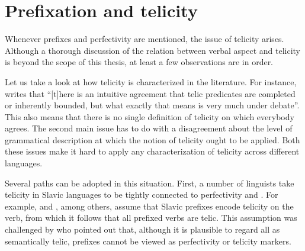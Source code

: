 \section{Prefixation and telicity}\label{section:new:telicity}
Whenever prefixes and perfectivity are mentioned, the issue of telicity arises. Although a thorough discussion of the relation between verbal aspect and telicity is beyond the scope of this thesis, at least a few observations are in order. %

Let us take a look at how telicity is characterized in the literature. For instance, \citet[3]{Rothstein:08a} writes that ``[t]here is an intuitive agreement that telic predicates are completed or inherently bounded, but what exactly that means is very much under debate''. This also means that there is no single definition of telicity on which everybody agrees. The second main issue has to do with a disagreement about the level of grammatical description at which the notion of telicity ought to be applied. Both these issues make it hard to apply any characterization of telicity across different languages. 

Several paths can be adopted in this situation. First, a number of linguists take telicity in Slavic languages to be tightly connected to perfectivity and . For example, \citet{Borer:03} and \citet{vanHout:08}, among others, assume that Slavic prefixes encode telicity on the verb, from which it follows that all prefixed verbs are telic. This assumption was challenged by \citet{Filip:03} who pointed out that, although it is plausible to regard all  as semantically telic, prefixes cannot be viewed as perfectivity or telicity markers.  

